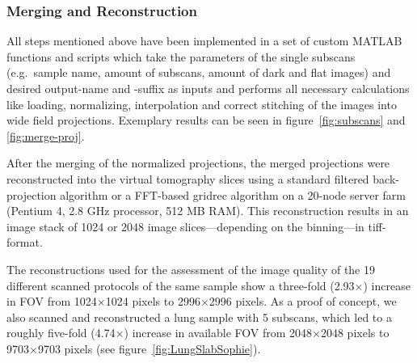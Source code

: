 
\subsubsection{Merging and Reconstruction}
All steps mentioned above have been implemented in a set of custom MATLAB functions and scripts which take the parameters of the single subscans (e.g.\ sample name, amount of subscans, amount of dark and flat images) and desired output-name and -suffix as inputs and performs all necessary calculations like loading, normalizing, interpolation and correct stitching of the images into wide field projections. Exemplary results can be seen in figure~\ref{fig:subscans} and \ref{fig:merge-proj}.

After the merging of the normalized projections, the merged projections were reconstructed into the virtual tomography slices using a standard filtered back-projection algorithm or a FFT-based gridrec algorithm on a 20-node server farm (Pentium 4, 2.8 GHz processor, 512 MB RAM). This reconstruction results in an image stack of 1024 or 2048 image slices---depending on the binning---in tiff-format.

The reconstructions used for the assessment of the image quality of the 19 different scanned protocols of the same sample show a three-fold (2.93$\times$) increase in FOV from 1024$\times$1024 pixels to 2996$\times$2996 pixels. As a proof of concept, we also scanned and reconstructed a lung sample with 5 subscans, which led to a roughly five-fold (4.74$\times$) increase in available FOV from 2048$\times$2048 pixels to 9703$\times$9703 pixels (see figure~\ref{fig:LungSlabSophie}).
